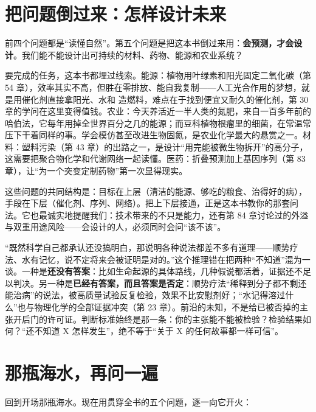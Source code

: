 \section{把问题倒过来：怎样设计未来}

前四个问题都是“读懂自然”。第五个问题是把这本书倒过来用：\textbf{会预测，才会设计}。我们能不能设计出可持续的材料、药物、能源和农业系统？

要完成的任务，这本书都埋过线索。能源：植物用叶绿素和阳光固定二氧化碳（第 54 章），效率其实不高，但胜在零排放、能自我复制——人工光合作用的梦想，就是用催化剂直接拿阳光、水和  造燃料，难点在于找到便宜又耐久的催化剂，第 30 章的学问在这里变得值钱。农业：今天养活近一半人类的氮肥，来自一百多年前的哈伯法，它每年用掉全世界百分之几的能源；而豆科植物根瘤里的细菌，在常温常压下干着同样的事。学会模仿甚至改进生物固氮，是农业化学最大的悬赏之一。材料：塑料污染（第 43 章）的出路之一，是设计“用完能被微生物拆开”的高分子，这需要把聚合物化学和代谢网络一起读懂。医药：折叠预测加上基因序列（第 83 章），让“为一个突变定制药物”第一次显得现实。

这些问题的共同结构是：目标在上层（清洁的能源、够吃的粮食、治得好的病），手段在下层（催化剂、序列、网络）。把上下层接通，正是这本书教你的那套问法。它也最诚实地提醒我们：技术带来的不只是能力，还有第 84 章讨论过的外溢与双重用途风险——会设计的人，必须同时会问“该不该”。

\begin{wuqu}
“既然科学自己都承认还没搞明白，那说明各种说法都差不多有道理——顺势疗法、水有记忆，说不定将来会被证明是对的。”这个推理错在把两种“不知道”混为一谈。一种是\textbf{还没有答案}：比如生命起源的具体路线，几种假说都活着，证据还不足以判决。另一种是\textbf{已经有答案，而且答案是否定}：顺势疗法“稀释到分子都不剩还能治病”的说法，被高质量试验反复检验，效果不比安慰剂好；“水记得溶过什么”也与物理化学的全部证据冲突（第 23 章）。前沿的未知，不是给已被否掉的主张开后门的许可证。判断标准始终是那一条：你的主张能不能被检验？检验结果如何？“还不知道 X 怎样发生”，绝不等于“关于 X 的任何故事都一样可信”。
\end{wuqu}

\section{那瓶海水，再问一遍}

回到开场那瓶海水。现在用贯穿全书的五个问题，逐一向它开火：


